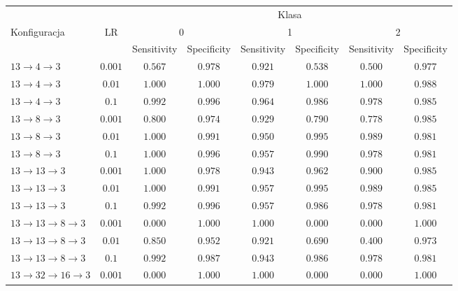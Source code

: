 {\scriptsize
\setlength{\tabcolsep}{3pt}
\begin{tabular}{@{}p{}c*{6}{c}@{}}
\toprule
\multicolumn{2}{c}{} & \multicolumn{6}{c}{Klasa} \\
\cmidrule(lr){3-8}
Konfiguracja & LR & \multicolumn{2}{c}{0} & \multicolumn{2}{c}{1} & \multicolumn{2}{c}{2} \\
\cmidrule(lr){3-4}\cmidrule(lr){5-6}\cmidrule(l){7-8}
& & Sensitivity & Specificity & Sensitivity & Specificity & Sensitivity & Specificity \\
\midrule
\(13 \rightarrow 4 \rightarrow 3\) & \(0.001\) & \(0.567\) & \(0.978\) & \(0.921\) & \(0.538\) & \(0.500\) & \(0.977\) \\
\(13 \rightarrow 4 \rightarrow 3\) & \(0.01\) & \(1.000\) & \(1.000\) & \(0.979\) & \(1.000\) & \(1.000\) & \(0.988\) \\
\(13 \rightarrow 4 \rightarrow 3\) & \(0.1\) & \(0.992\) & \(0.996\) & \(0.964\) & \(0.986\) & \(0.978\) & \(0.985\) \\
\(13 \rightarrow 8 \rightarrow 3\) & \(0.001\) & \(0.800\) & \(0.974\) & \(0.929\) & \(0.790\) & \(0.778\) & \(0.985\) \\
\(13 \rightarrow 8 \rightarrow 3\) & \(0.01\) & \(1.000\) & \(0.991\) & \(0.950\) & \(0.995\) & \(0.989\) & \(0.981\) \\
\(13 \rightarrow 8 \rightarrow 3\) & \(0.1\) & \(1.000\) & \(0.996\) & \(0.957\) & \(0.990\) & \(0.978\) & \(0.981\) \\
\(13 \rightarrow 13 \rightarrow 3\) & \(0.001\) & \(1.000\) & \(0.978\) & \(0.943\) & \(0.962\) & \(0.900\) & \(0.985\) \\
\(13 \rightarrow 13 \rightarrow 3\) & \(0.01\) & \(1.000\) & \(0.991\) & \(0.957\) & \(0.995\) & \(0.989\) & \(0.985\) \\
\(13 \rightarrow 13 \rightarrow 3\) & \(0.1\) & \(0.992\) & \(0.996\) & \(0.957\) & \(0.986\) & \(0.978\) & \(0.981\) \\
\(13 \rightarrow 13 \rightarrow 8 \rightarrow 3\) & \(0.001\) & \(0.000\) & \(1.000\) & \(1.000\) & \(0.000\) & \(0.000\) & \(1.000\) \\
\(13 \rightarrow 13 \rightarrow 8 \rightarrow 3\) & \(0.01\) & \(0.850\) & \(0.952\) & \(0.921\) & \(0.690\) & \(0.400\) & \(0.973\) \\
\(13 \rightarrow 13 \rightarrow 8 \rightarrow 3\) & \(0.1\) & \(0.992\) & \(0.987\) & \(0.943\) & \(0.986\) & \(0.978\) & \(0.981\) \\
\(13 \rightarrow 32 \rightarrow 16 \rightarrow 3\) & \(0.001\) & \(0.000\) & \(1.000\) & \(1.000\) & \(0.000\) & \(0.000\) & \(1.000\) \\

\end{tabular}}
